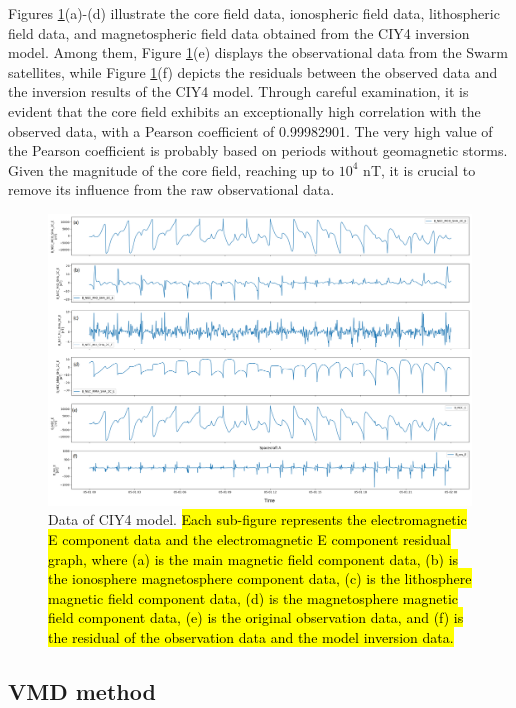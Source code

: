 \documentclass[3p,authoryear,preprint,12pt]{elsarticle}
\begin{document}
Figures \ref{fig:cyi4}(a)-(d) illustrate the core field data, ionospheric field data, lithospheric field data, and magnetospheric field data obtained from the CIY4 inversion model. Among them, Figure \ref{fig:cyi4}(e) displays the observational data from the Swarm satellites, while Figure \ref{fig:cyi4}(f) depicts the residuals between the observed data and the inversion results of the CIY4 model. Through careful examination, it is evident that the core field exhibits an exceptionally high correlation with the observed data, with a Pearson coefficient of 0.99982901. {The very high value of the Pearson coefficient is probably based on periods without geomagnetic storms.} Given the magnitude of the core field, reaching up to $10^4$ nT, it is crucial to remove its influence from the raw observational data.
\begin{figure}[htbp]
	\centering
	\includegraphics[width=1\linewidth]{CYI4Eng.png}
	\caption{Data of CIY4 model. \hl{Each sub-figure represents the electromagnetic E component data and the electromagnetic E component residual graph, where (a) is the main magnetic field component data, (b) is the ionosphere magnetosphere component data, (c) is the lithosphere magnetic field component data, (d) is the magnetosphere magnetic field component data, (e) is the original observation data, and (f) is the residual of the observation data and the model inversion data.}}
	\label{fig:cyi4}
\end{figure}
\iffalse
\subsection{VMD method}
\end{document}
